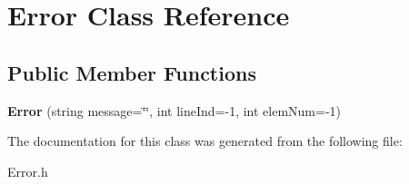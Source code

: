 \hypertarget{classError}{}\section{Error Class Reference}
\label{classError}
\subsection*{Public Member Functions}
\begin{DoxyCompactItemize}
\item 
\hypertarget{classError_a2387580fb880bd9c740ec6882b9d3701}{}{\bfseries Error} (string message=\char`\"{}\char`\"{}, int line\+Ind=-\/1, int elem\+Num=-\/1)\label{classError_a2387580fb880bd9c740ec6882b9d3701}

\end{DoxyCompactItemize}


The documentation for this class was generated from the following file\+:\begin{DoxyCompactItemize}
\item 
Error.\+h\end{DoxyCompactItemize}
